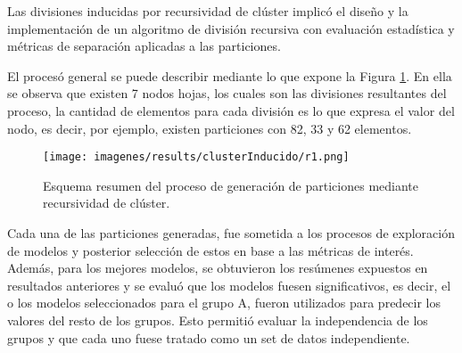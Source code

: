 Las divisiones inducidas por recursividad de cl\'uster implic\'o el dise\~no y la implementaci\'on de un algoritmo de divisi\'on recursiva con evaluaci\'on estad\'istica y m\'etricas de separaci\'on aplicadas a las particiones. 

El proces\'o general se puede describir mediante lo que expone la Figura \ref{ind1}. En ella se observa que existen 7 nodos hojas, los cuales son las divisiones resultantes del proceso, la cantidad de elementos para cada divisi\'on es lo que expresa el valor del nodo, es decir, por ejemplo, existen particiones con 82, 33 y 62 elementos. 

\begin{figure}[!h]
	\centering
	\texttt{[image: imagenes/results/clusterInducido/r1.png]}
	\caption{Esquema resumen del proceso de generaci\'on de particiones mediante recursividad de cl\'uster.}
	\label{ind1}
\end{figure}

\newpage
Cada una de las particiones generadas, fue sometida a los procesos de exploraci\'on de modelos y posterior selecci\'on de estos en base a las m\'etricas de inter\'es. Adem\'as, para los mejores modelos, se obtuvieron los res\'umenes expuestos en resultados anteriores y se evalu\'o que los modelos fuesen significativos, es decir, el o los modelos seleccionados para el grupo A, fueron utilizados para predecir los valores del resto de los grupos. Esto permiti\'o evaluar la independencia de los grupos y que cada uno fuese tratado como un set de datos independiente.
